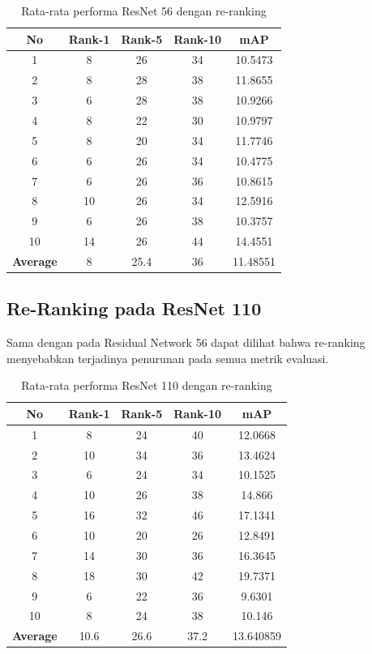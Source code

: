 \begin{longtable}{|c|c|c|c|c|}
	\caption{Rata-rata performa ResNet 56 dengan re-ranking}
	\label{tabel:10}\\
	\hline
	\rowcolor[HTML]{C0C0C0}
	\textbf{No} &\textbf{Rank-1} & \textbf{Rank-5} & \textbf{Rank-10} & \textbf{mAP} \\
	\hline
	1 &8 &26 &34 &10.5473 \\
	2 &8 &28 &38 &11.8655 \\
	3 &6 &28 &38 &10.9266 \\
	4 &8 &22 &30 &10.9797 \\
	5 &8 &20 &34 &11.7746 \\
	6 &6 &26 &34 &10.4775 \\
	7 &6 &26 &36 &10.8615 \\
	8 &10 &26 &34 &12.5916 \\
	9 &6 &26 &38 &10.3757 \\
	10 &14 &26 &44 &14.4551 \\
	\hline
	\textbf{Average} & 8 & 25.4 & 36 &11.48551 \\
	\hline
\end{longtable}

\subsection{Re-Ranking pada ResNet 110}
\vspace{2ex}
Sama dengan pada Residual Network 56 dapat dilihat bahwa re-ranking menyebabkan terjadinya penurunan pada semua metrik evaluasi.

\begin{longtable}{|c|c|c|c|c|}
	\caption{Rata-rata performa ResNet 110 dengan re-ranking}
	\label{tabel:11}\\
	\hline
	\rowcolor[HTML]{C0C0C0}
	\textbf{No} &\textbf{Rank-1} & \textbf{Rank-5} & \textbf{Rank-10} & \textbf{mAP} \\
	\hline
	1 &8 &24 &40 &12.0668 \\
	2 &10 &34 &36 &13.4624 \\
	3 &6 &24 &34 &10.1525 \\
	4 &10 &26 &38 &14.866 \\
	5 &16 &32 &46 &17.1341 \\
	6 &10 &20 &26 &12.8491 \\
	7 &14 &30 &36 &16.3645 \\
	8 &18 &30 &42 &19.7371 \\
	9 &6 &22 &36 &9.6301 \\
	10 &8 &24 &38 &10.146 \\
	\hline
	\textbf{Average} & 10.6 & 26.6 & 37.2 &13.640859 \\
	\hline
\end{longtable}

